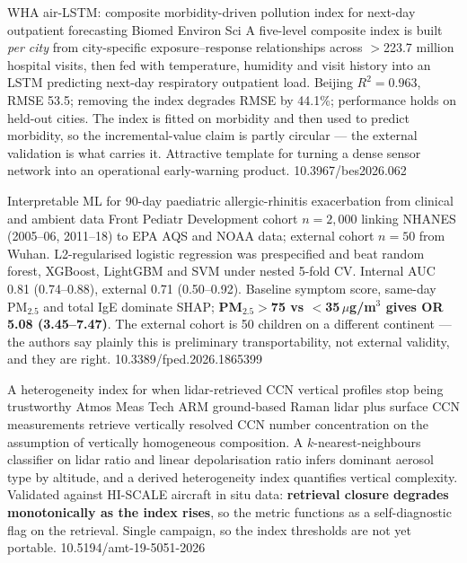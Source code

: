 \documentclass[10pt]{article}
\begin{document}
{WHA air-LSTM: composite morbidity-driven pollution index for next-day outpatient forecasting}
{Biomed Environ Sci}
{A five-level composite index is built \emph{per city} from city-specific
exposure--response relationships across $>$223.7 million hospital visits, then fed with
temperature, humidity and visit history into an LSTM predicting next-day respiratory
outpatient load. Beijing $R^2=0.963$, RMSE 53.5; removing the index degrades RMSE by
44.1\%; performance holds on held-out cities. The index is fitted on morbidity and then
used to predict morbidity, so the incremental-value claim is partly circular --- the
external validation is what carries it. Attractive template for turning a dense sensor
network into an operational early-warning product.}
{10.3967/bes2026.062}

{Interpretable ML for 90-day paediatric allergic-rhinitis exacerbation from clinical and ambient data}
{Front Pediatr}
{Development cohort $n=2{,}000$ linking NHANES (2005--06, 2011--18) to EPA AQS and NOAA
data; external cohort $n=50$ from Wuhan. L2-regularised logistic regression was
prespecified and beat random forest, XGBoost, LightGBM and SVM under nested 5-fold CV.
Internal AUC 0.81 (0.74--0.88), external 0.71 (0.50--0.92). Baseline symptom score,
same-day PM$_{2.5}$ and total IgE dominate SHAP; \textbf{PM$_{2.5}>$75 vs
$<$35\,$\mu$g/m$^3$ gives OR 5.08 (3.45--7.47)}. The external cohort is 50 children on a
different continent --- the authors say plainly this is preliminary transportability, not
external validity, and they are right.}
{10.3389/fped.2026.1865399}

{A heterogeneity index for when lidar-retrieved CCN vertical profiles stop being trustworthy}
{Atmos Meas Tech}
{ARM ground-based Raman lidar plus surface CCN measurements retrieve vertically resolved
CCN number concentration on the assumption of vertically homogeneous composition. A
$k$-nearest-neighbours classifier on lidar ratio and linear depolarisation ratio infers
dominant aerosol type by altitude, and a derived heterogeneity index quantifies vertical
complexity. Validated against HI-SCALE aircraft in situ data: \textbf{retrieval closure
degrades monotonically as the index rises}, so the metric functions as a self-diagnostic
flag on the retrieval. Single campaign, so the index thresholds are not yet portable.}
{10.5194/amt-19-5051-2026}

\clearpage

\end{document}
